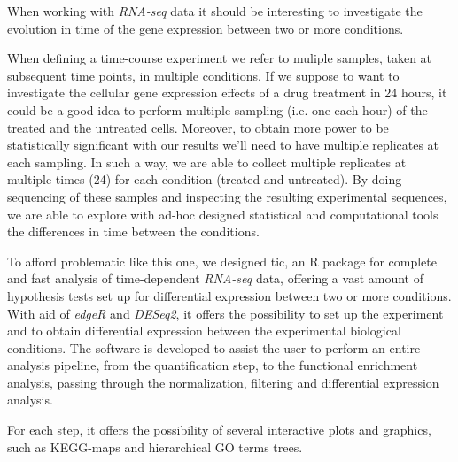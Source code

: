 When working with \textit{RNA-seq} data it should be interesting to investigate the evolution in time of the gene expression between two or more conditions.

When defining a time-course experiment we refer to muliple samples, taken at subsequent time points, in multiple conditions.
If we suppose to want to investigate the cellular gene expression effects of a drug treatment in 24 hours, it could be a good idea to perform multiple sampling (i.e. one each hour) of the treated and the untreated cells.
Moreover, to obtain more power to be statistically significant with our results we'll need to have multiple replicates at each sampling.
In such a way, we are able to collect multiple replicates at multiple times (24) for each condition (treated and untreated).
By doing sequencing of these samples and inspecting the resulting experimental sequences, we are able to explore with ad-hoc designed statistical and computational tools the differences in time between the conditions.

To afford problematic like this one, we designed \gls{tic}, an R package for complete and fast analysis of time-dependent \textit{RNA-seq} data, offering a vast amount of hypothesis tests set up for differential expression between two or more conditions.
With aid of \textit{edgeR} and \textit{DESeq2}, it offers the possibility to set up the experiment and to obtain differential expression between the experimental biological conditions.
The software is developed to assist the user to perform an entire analysis pipeline, from the quantification step, to the functional enrichment analysis, passing through the normalization, filtering and differential expression analysis.

For each step, it offers the possibility of several interactive plots and graphics, such as KEGG-maps and hierarchical GO terms trees.